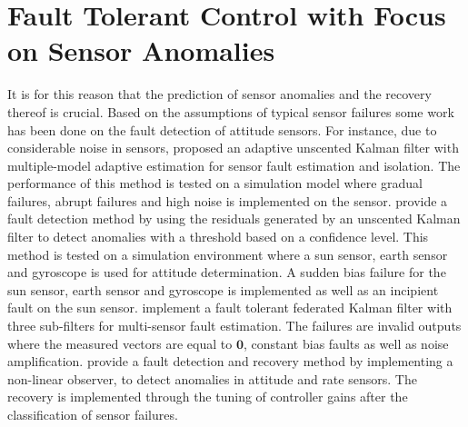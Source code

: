 \section{Fault Tolerant Control with Focus on Sensor Anomalies}
It is for this reason that the prediction of sensor anomalies and the recovery thereof is crucial. Based on the assumptions of typical sensor failures some work has been done on the fault detection of attitude sensors. For instance, due to considerable noise in sensors, \cite{wang2019adaptive} proposed an adaptive unscented Kalman filter with multiple-model adaptive estimation for sensor fault estimation and isolation. The performance of this method is tested on a simulation model where gradual failures, abrupt failures and high noise is implemented on the sensor. \cite{Xiong2007} provide a fault detection method by using the residuals generated by an unscented Kalman filter to detect anomalies with a threshold based on a confidence level. This method is tested on a simulation environment where a sun sensor, earth sensor and gyroscope is used for attitude determination. A sudden bias failure for the sun sensor, earth sensor and gyroscope is implemented as well as an incipient fault on the sun sensor. \cite{Zhou2016} implement a fault tolerant federated Kalman filter with three sub-filters for multi-sensor fault estimation. The failures are invalid outputs where the measured vectors are equal to $\mathbf{0}$, constant bias faults as well as noise amplification.  \cite{Nasrolahi2018} provide a fault detection and recovery method by implementing a non-linear observer, to detect anomalies in attitude and rate sensors. The recovery is implemented through the tuning of controller gains after the classification of sensor failures.

